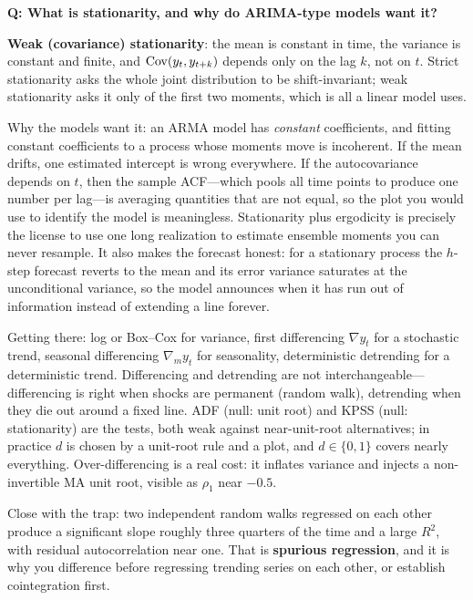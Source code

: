 \begin{interviewq}
\textbf{Q: What is stationarity, and why do ARIMA-type models want it?}

 \quad {} \quad \badgefreq{\freqmed}

\stronganswer

\textbf{Weak (covariance) stationarity}: the mean is constant in time, the variance is constant and finite, and $\operatorname{Cov}(y_t, y_{t+k})$ depends only on the lag $k$, not on $t$. Strict stationarity asks the whole joint distribution to be shift-invariant; weak stationarity asks it only of the first two moments, which is all a linear model uses.

Why the models want it: an ARMA model has \emph{constant} coefficients, and fitting constant coefficients to a process whose moments move is incoherent. If the mean drifts, one estimated intercept is wrong everywhere. If the autocovariance depends on $t$, then the sample ACF---which pools all time points to produce one number per lag---is averaging quantities that are not equal, so the plot you would use to identify the model is meaningless. Stationarity plus ergodicity is precisely the license to use one long realization to estimate ensemble moments you can never resample. It also makes the forecast honest: for a stationary process the $h$-step forecast reverts to the mean and its error variance saturates at the unconditional variance, so the model announces when it has run out of information instead of extending a line forever.

Getting there: log or Box--Cox for variance, first differencing $\nabla y_t$ for a stochastic trend, seasonal differencing $\nabla_m y_t$ for seasonality, deterministic detrending for a deterministic trend. Differencing and detrending are not interchangeable---differencing is right when shocks are permanent (random walk), detrending when they die out around a fixed line. ADF (null: unit root) and KPSS (null: stationarity) are the tests, both weak against near-unit-root alternatives; in practice $d$ is chosen by a unit-root rule and a plot, and $d \in \{0,1\}$ covers nearly everything. Over-differencing is a real cost: it inflates variance and injects a non-invertible MA unit root, visible as $\rho_1$ near $-0.5$.

Close with the trap: two independent random walks regressed on each other produce a significant slope roughly three quarters of the time and a large $R^2$, with residual autocorrelation near one. That is \textbf{spurious regression}, and it is why you difference before regressing trending series on each other, or establish cointegration first.


\end{interviewq}
